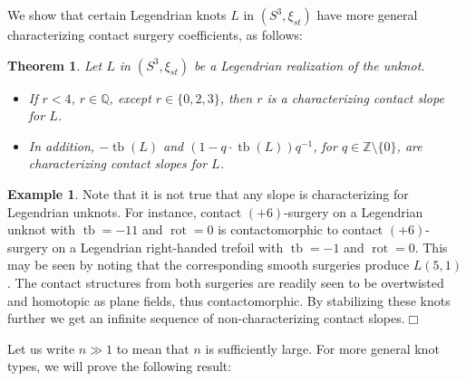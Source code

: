 \documentclass[11pt]{amsart} %
\DeclareMathOperator{\tb}{tb}
\DeclareMathOperator{\rot}{rot}
\newcommand{\Z}{\mathbb{Z}}
\newcommand{\Q}{\mathbb{Q}}
\theoremstyle{plain}
\newtheorem{thm}[Theorem]{Theorem}
\theoremstyle{definition}
\newtheorem{ex}[Theorem]{Example}
\begin{document}
We show that certain Legendrian knots $L$ in $(S^3,\xi_{st})$ have more general characterizing contact surgery coefficients, as follows:

\begin{thm}\label{uknotchar}
	Let $L$ in $(S^3,\xi_{st})$ be a Legendrian realization of the unknot.
\begin{itemize}
	\item[(i)] If $r<4$, $r\in\Q$, except $r\in\{0,2,3\}$, then $r$ is a characterizing contact slope for $L$.	
	\item[(ii)] In addition, $-\tb(L)$ and $(1-q\cdot \tb(L))q^{-1}$, for $q\in\Z\setminus\{0\}$, are characterizing contact slopes for $L$.
\end{itemize}
\end{thm}

\begin{ex}\label{ex:noncharunknot}
Note that it is not true that any slope is characterizing for Legendrian unknots. For instance, contact $(+6)$-surgery on a Legendrian unknot with $\tb=-11$ and $\rot=0$ is contactomorphic to contact $(+6)$-surgery on a Legendrian right-handed trefoil with $\tb=-1$ and $\rot=0$.  This may be seen by noting that the corresponding smooth surgeries produce $L(5,1)$. The contact structures from both surgeries are readily seen to be overtwisted and homotopic as plane fields, thus contactomorphic. By stabilizing these knots further we get an infinite sequence of non-characterizing contact slopes.\hfill$\Box$
\end{ex}

Let us write $n\gg1$ to mean that $n$ is sufficiently large. For more general knot types, we will prove the following result:
\end{document}
